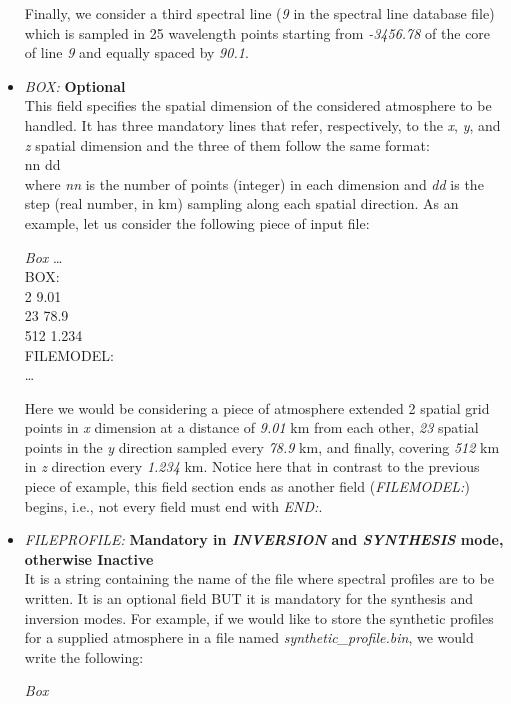 \begin{itemize}
  Finally, we consider a third spectral line ({\it 9} in the spectral line database file) which is sampled in 25 wavelength points starting from {\it -3456.78} of the core of line {\it 9} and equally spaced by {\it 90.1}.\\
  \item {\it BOX:} {\bf Optional}\\
  This field specifies the spatial dimension of the considered atmosphere to be handled. It has three mandatory lines that refer, respectively, to the {\it x}, {\it y}, and {\it z} spatial dimension and the three of them follow the same format:\\
  nn   dd\\
  where {\it nn} is the number of points (integer) in each dimension and {\it dd } is the step (real number, in km) sampling along each spatial direction. As an example, let us consider the following piece of input file:\\
\begin{ifbox}[label={tb:box}]{{\it Box}}
  \scriptsize
  \ldots\\
  BOX:\\
  2  9.01\\
  23  78.9\\
  512  1.234\\
  FILEMODEL:\\
  \ldots
  \normalsize
\end{ifbox}
  Here we would be considering a piece of atmosphere extended 2 spatial grid points in {\it x} dimension at a distance of {\it 9.01} km from each other, {\it 23 } spatial points in the {\it y} direction sampled every {\it 78.9} km, and finally, covering {\it 512} km in {\it z} direction every {\it 1.234} km. Notice here that in contrast to the previous piece of example, this field section ends as another field ({\it FILEMODEL:}) begins, i.e., not every field must end with {\it END:}.\\
  \item {\it FILEPROFILE:} {\bf Mandatory in {\it INVERSION} and {\it SYNTHESIS} mode, otherwise Inactive}\\
  It is a string containing the name of the file where spectral profiles are to be written. It is an optional field BUT it is mandatory for the synthesis and inversion modes. For example, if we would like to store the synthetic profiles for a supplied atmosphere in a file named {\it synthetic\_profile.bin}, we would write the following:\\
\begin{ifbox}[label={tb:box}]{{\it Box}}

\end{ifbox}
\end{itemize}
